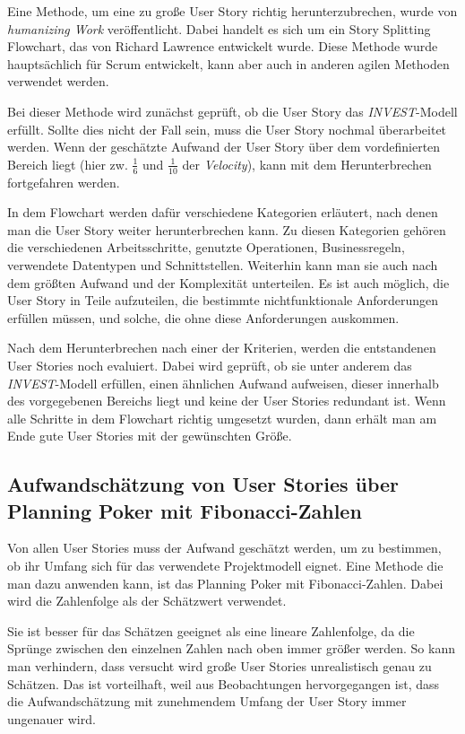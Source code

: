 \documentclass[acmtog]{acmart}
\begin{document}
Eine Methode, um eine zu große User Story richtig herunterzubrechen, wurde von \emph{humanizing Work} veröffentlicht. Dabei handelt es sich um ein Story 
Splitting Flowchart, das von Richard Lawrence entwickelt wurde. Diese Methode wurde hauptsächlich für Scrum entwickelt, kann aber auch 
in anderen agilen Methoden verwendet werden. \cite{humanizingwork}

Bei dieser Methode wird zunächst geprüft, ob die User Story das \emph{INVEST}-Modell erfüllt. Sollte dies nicht der Fall sein, muss die User Story nochmal 
überarbeitet werden. Wenn der geschätzte Aufwand der User Story über dem vordefinierten Bereich liegt (hier zw. \( \frac{1}{6} \) und \( \frac{1}{10} \) der \emph{Velocity}), kann mit dem Herunterbrechen 
fortgefahren werden. \cite{humanizingwork}

In dem Flowchart werden dafür verschiedene Kategorien erläutert, nach denen man die User Story weiter herunterbrechen kann. Zu diesen Kategorien 
gehören die verschiedenen Arbeitsschritte, genutzte Operationen, Businessregeln, verwendete Datentypen und Schnittstellen. Weiterhin kann man sie auch nach dem größten 
Aufwand und der Komplexität unterteilen. Es ist auch möglich, die User Story in Teile aufzuteilen, die bestimmte nichtfunktionale Anforderungen erfüllen müssen, 
und solche, die ohne diese Anforderungen auskommen. \cite{humanizingwork}

Nach dem Herunterbrechen nach einer der Kriterien, werden die entstandenen User Stories noch evaluiert. Dabei wird geprüft, ob sie unter anderem das \emph{INVEST}-Modell erfüllen, einen 
ähnlichen Aufwand aufweisen, dieser innerhalb des vorgegebenen Bereichs liegt und keine der User Stories redundant ist. Wenn alle Schritte in dem Flowchart richtig umgesetzt wurden, 
dann erhält man am Ende gute User Stories mit der gewünschten Größe. \cite{humanizingwork}

\subsection{Aufwandschätzung von User Stories über Planning Poker mit Fibonacci-Zahlen} \label{sec:effort}

Von allen User Stories muss der Aufwand geschätzt werden, um zu bestimmen, ob ihr Umfang sich für das verwendete Projektmodell eignet. 
Eine Methode die man dazu anwenden kann, ist das Planning Poker mit Fibonacci-Zahlen. Dabei wird die Zahlenfolge als der Schätzwert verwendet. \cite{planingpoker}

Sie ist besser für das Schätzen geeignet als eine lineare Zahlenfolge, da die Sprünge zwischen den einzelnen Zahlen nach oben immer größer werden. So kann man 
verhindern, dass versucht wird große User Stories unrealistisch genau zu Schätzen. Das ist vorteilhaft, weil aus Beobachtungen hervorgegangen ist, dass 
die Aufwandschätzung mit zunehmendem Umfang der User Story immer ungenauer wird. \cite{planingpoker}
\end{document}
